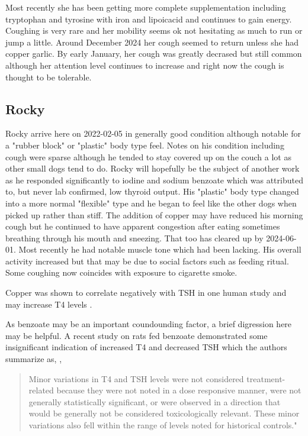 Most recently she has been getting more complete supplementation
including tryptophan and tyrosine with iron and lipoicacid
and continues to gain energy. Coughing is very rare and her mobility
seems ok not hesitating as much to run or jump a little.  
Around December 2024 her cough seemed to return unless she
had copper garlic. By early January, her cough was greatly
decrased but still common although her attention
level continues to increase and right now the cough is thought
to be tolerable.


\subsection{Rocky}

\mjmrockycu

\mjmrockyi

Rocky arrive here on 2022-02-05 in generally good condition
although notable for a "rubber block" or "plastic" body type feel.
Notes on his condition including cough were sparse although
he tended to stay covered up on the couch a lot as other small
dogs tend to do. 
Rocky will hopefully be the subject of another work as
he responded significantly to iodine and sodium benzoate
which was attributed to, but never lab confirmed, low
thyroid output. His "plastic" body type changed into
a more normal "flexible" type and he began to feel like 
the other dogs when picked up rather than stiff.
The addition of copper may have reduced his morning cough
but he continued to have apparent congestion after eating
sometimes breathing through his mouth and sneezing.
That too has cleared up by 2024-06-01.
Most recently he had notable muscle tone which had been lacking.
His overall activity increased but that may be due to social factors
such as feeding ritual. 
Some coughing now coincides with exposure to cigarette smoke.


Copper was shown to correlate negatively with TSH
in one human study and may increase T4 levels 
\cite{10.3389/fendo.2023.1134208}.


As benzoate may be an important coundounding factor,
a brief digression here may be helpful. 
A recent study on rats fed benzoate demonstrated
some insignificant indication of increased T4 and decreased
TSH which the authors summarize as,
\cite{TURNBULL2021104897}
,
\begin{quote}
Minor variations in T4 and TSH levels were not considered treatment-related because they were not noted in a dose responsive manner, were not generally statistically significant, or were observed in a direction that would be generally not be considered toxicologically relevant. These minor variations also fell within the range of levels noted for historical controls."
\end{quote}

